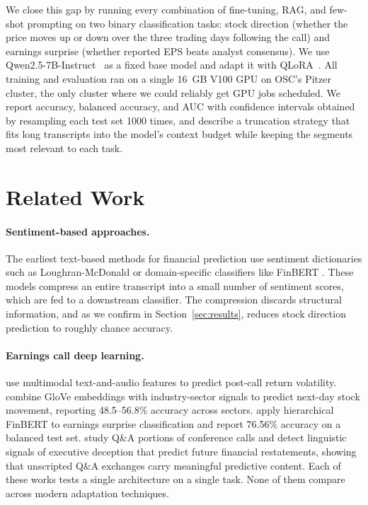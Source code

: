 \documentclass[11pt]{article}
\begin{document}
We close this gap by running every combination of fine-tuning, RAG,
and few-shot prompting on two binary classification tasks: stock
direction (whether the price moves up or down over the three trading
days following the call) and earnings surprise (whether reported EPS
beats analyst consensus). We use Qwen2.5-7B-Instruct~\citep{Qwen25} as
a fixed base model and adapt it with
QLoRA~\citep{Dettmers2023,Hu2022}. All training and evaluation ran on
a single 16~GB V100 GPU on OSC's Pitzer cluster, the only cluster
where we could reliably get GPU jobs scheduled. We report accuracy,
balanced accuracy, and AUC with confidence intervals obtained by
resampling each test set 1000 times, and describe a truncation
strategy that fits long transcripts into the model's context budget
while keeping the segments most relevant to each task.

\section{Related Work}

\begingroup
\raggedright

\paragraph{Sentiment-based approaches.}
The earliest text-based methods for financial prediction use
sentiment dictionaries such as Loughran-McDonald
\citep{Loughran2011} or domain-specific classifiers like FinBERT
\citep{Araci2019,Yang2020}. These models compress an entire
transcript into a small number of sentiment scores, which are fed to
a downstream classifier. The compression discards structural
information, and as we confirm in Section~\ref{sec:results}, reduces
stock direction prediction to roughly chance accuracy.

\paragraph{Earnings call deep learning.}
\citet{Qin2019} use multimodal text-and-audio features to predict
post-call return volatility. \citet{Ma2020} combine GloVe embeddings
with industry-sector signals to predict next-day stock movement,
reporting 48.5--56.8\% accuracy across sectors. \citet{Koval2023}
apply hierarchical FinBERT to earnings surprise classification and
report 76.56\% accuracy on a balanced test set.
\citet{LarckerZakolyukina2012} study Q\&A portions of conference
calls and detect linguistic signals of executive deception that
predict future financial restatements, showing that unscripted Q\&A
exchanges carry meaningful predictive content. Each of these works
tests a single architecture on a single task. None of them compare
across modern adaptation techniques.
\end{document}
